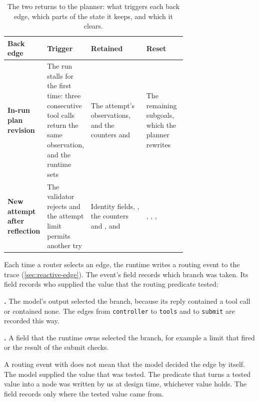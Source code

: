 \begin{table}[t]
  \centering
  \caption{The two returns to the planner: what triggers each back edge, which parts of the state
  it keeps, and which it clears.}
  \label{tab:control-backedges}
  \begin{adjustbox}{width=\linewidth}\begin{tabularx}{\linewidth}{@{}L{0.16\linewidth}L{0.24\linewidth}L{0.31\linewidth}X@{}}
    \toprule
    \textbf{Back edge} & \textbf{Trigger} & \textbf{Retained} & \textbf{Reset} \\
    \midrule
    \textbf{In-run plan revision} & The run stalls for the first time: three consecutive tool calls
      return the same observation, and the runtime sets 
      & The attempt's observations, and the counters  and 
      & The remaining subgoals, which the planner rewrites \\ \addlinespace
    \textbf{New attempt after reflection} & The validator rejects and the attempt limit permits
      another try & Identity fields, , the counters  and
      , and 
      & , , ,  \\
    \bottomrule
  \end{tabularx}\end{adjustbox}
\end{table}

Each time a router selects an edge, the runtime writes a routing event to the trace
(\cref{sec:reactive-edge}). The event's  field records which branch was taken.
Its  field records who supplied the value that the routing predicate tested:

\bi
\item \textbf{.} The model's output selected the branch, because its reply
contained a tool call or contained none. The edges from \texttt{controller} to \texttt{tools} and
to \texttt{submit} are recorded this way.
\item \textbf{.} A field that the runtime owns selected the branch, for
example a limit that fired or the result of the submit checks.
\ei

A routing event with  does not mean that the model decided the edge by itself.
The model supplied the value that was tested. The predicate that turns a tested value into a node
was written by us at design time, whichever value  holds. The  field
records only where the tested value came from.

